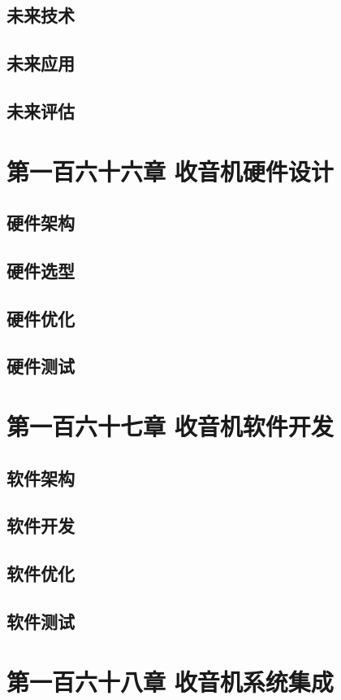 \documentclass[12pt,UTF8]{ctexbook}
\begin{document}
\section{未来技术}
\section{未来应用}
\section{未来评估}

\chapter{第一百六十六章 收音机硬件设计}

\section{硬件架构}
\section{硬件选型}
\section{硬件优化}
\section{硬件测试}

\chapter{第一百六十七章 收音机软件开发}

\section{软件架构}
\section{软件开发}
\section{软件优化}
\section{软件测试}

\chapter{第一百六十八章 收音机系统集成}
\end{document}
